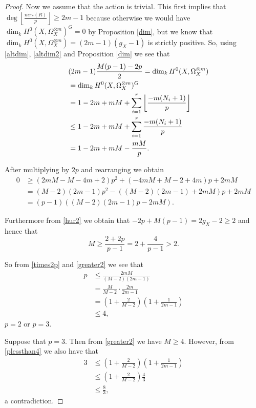 \begin{proof}
    Now we assume that the action is trivial. This first implies that 
    $\deg \left\lfloor\frac{m\pi_*(R)}{p}\right\rfloor \geq 2m-1$ because otherwise we would 
    have $\dim_kH^0(X,\Omega_X^{\otimes m})^G=0$ by Proposition \ref{dim}, but we know that 
    $\dim_kH^0(X,\Omega_X^{\otimes m})=(2m-1)(g_X-1)$ is strictly positive. 
    So, using \eqref{altdim}, \eqref{altdim2} and Proposition \ref{dim} we see that
        \begin{align}\label{bound}
        \lefteqn{(2m-1)\frac{M(p-1)-2p}{2} = \dim_kH^0(X,\Omega_X^{\otimes m})} \nonumber\\
        & =  \dim_kH^0(X,\Omega_X^{\otimes m})^G \nonumber\\
        & =  1-2m+mM+\sum_{i=1}^r\left\lfloor\frac{-m(N_i+1)}{p}\right\rfloor\nonumber \\
        & \leq  1-2m+mM+\sum_{i=1}^r\frac{-m(N_i+1)}{p}\nonumber \\
        & =  1-2m+mM-\frac{mM}{p}.
        \end{align}
    
    After multiplying by $2p$ and rearranging we obtain
        \begin{align}\label{times2p}
        0 & \geq  (2mM-M-4m+2)p^2+(-4mM+M-2+4m)p+2mM \nonumber \\
        & =  (M-2)(2m-1)p^2-((M-2)(2m-1)+2mM)p+2mM \nonumber \\
        & =  (p-1)((M-2)(2m-1)p-2mM).
        \end{align}
    
    Furthermore from \eqref{hur2} we obtain that $-2p+M(p-1)=2g_X-2 \geq 2$ and hence that 
        \begin{equation}\label{greater2}
        M\geq \frac{2+2p}{p-1}=2+\frac{4}{p-1}>2.
        \end{equation}
    
    So from \eqref{times2p} and \eqref{greater2} we see that
        \begin{align}\label{plessthan4}
        p & \leq  \frac{2mM}{(M-2)(2m-1)}\nonumber\\
        & =  \frac{M}{M-2}\cdot\frac{2m}{2m-1}\nonumber\\
        & =  \left( 1+\frac{2}{M-2} \right) \left(1+\frac{1}{2m-1} \right)\\
        & \leq  4, \nonumber	
        \end{align}
    \ie $p=2$ or $p=3$. 
    
    Suppose that $p=3$. Then from \eqref{greater2} we have $M\geq 4$. However, from  \eqref{plessthan4} we also have that 
        \begin{align*}
        3 & \leq \left( 1+\frac{2}{M-2} \right) \left(1+\frac{1}{2m-1} \right)\\
        & \leq  \left( 1+\frac{2}{M-2} \right) \frac{4}{3}\\
        & \leq  \frac{8}{3},
        \end{align*}
    a contradiction.
    

\end{proof}
